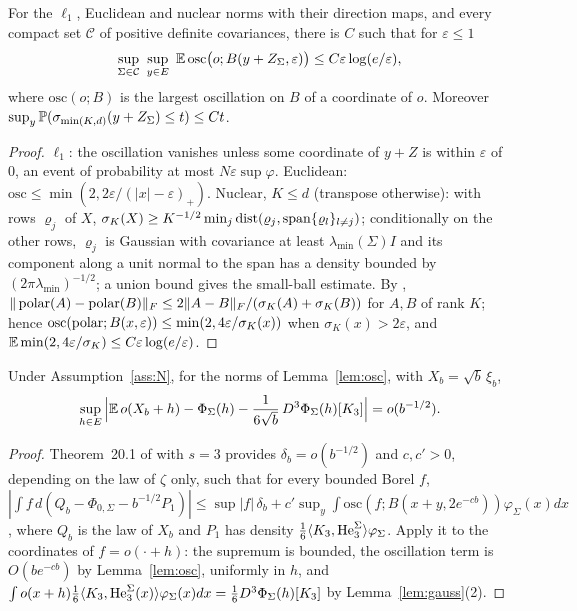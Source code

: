 \begin{lemma}[oscillation]\label{lem:osc}
For the $\ell_1$, Euclidean and nuclear norms with their direction maps, and every compact set $\mathcal C$ of positive
definite covariances, there is $C$ such that for $\varepsilon\le1$
\[
\sup_{\Sigma\in\mathcal C}\ \sup_{y\in E}\ \E\,\mathrm{osc}\big(o;B(y+Z_\Sigma,\varepsilon)\big)\le C\varepsilon\log(e/\varepsilon),
\]
where $\mathrm{osc}(o;B)$ is the largest oscillation on $B$ of a coordinate of $o$. Moreover
$\sup_y\mathbb{P}(\sigma_{\min(K,d)}(y+Z_\Sigma)\le t)\le Ct$.
\end{lemma}
\begin{proof}
$\ell_1$: the oscillation vanishes unless some coordinate of $y+Z$ is within $\varepsilon$ of $0$, an event of
probability at most $N\varepsilon\sup\varphi$. Euclidean: $\mathrm{osc}\le\min(2,2\varepsilon/(|x|-\varepsilon)_+)$.
Nuclear, $K\le d$ (transpose otherwise): with rows $\varrho_j$ of $X$,
$\sigma_K(X)\ge K^{-1/2}\min_j\operatorname{dist}(\varrho_j,\operatorname{span}\{\varrho_l\}_{l\ne j})$; conditionally on the other rows,
$\varrho_j$ is Gaussian with covariance at least $\lambda_{\min}(\Sigma)I$ and its component along a unit normal to the
span has a density bounded by $(2\pi\lambda_{\min})^{-1/2}$; a union bound gives the small-ball estimate. By
\citet{lisun}, $\|\operatorname{polar}(A)-\operatorname{polar}(B)\|_{F}\le2\|A-B\|_{F}/(\sigma_K(A)+\sigma_K(B))$ for $A,B$ of rank $K$; hence
$\mathrm{osc}(\operatorname{polar};B(x,\varepsilon))\le\min(2,4\varepsilon/\sigma_K(x))$ when $\sigma_K(x)>2\varepsilon$, and
$\mathbb{E}\min(2,4\varepsilon/\sigma_K)\le C\varepsilon\log(e/\varepsilon)$.
\end{proof}

\begin{lemma}\label{lem:edge}
Under Assumption~\ref{ass:N}, for the norms of Lemma~\ref{lem:osc}, with $X_b=\sqrt b\,\xi_b$,
\[
\sup_{h\in E}\Big|\mathbb{E}\,o(X_b+h)-\Phi_\Sigma(h)-\frac1{6\sqrt b}\,D^3\Phi_\Sigma(h)[K_3]\Big|=o(b^{-1/2}).
\]
\end{lemma}
\begin{proof}
Theorem~20.1 of \citet{br} with $s=3$ provides $\delta_b=o(b^{-1/2})$ and $c,c'>0$, depending on the law of $\zeta$ only,
such that for every bounded Borel $f$,
$|\int f\,d(Q_b-\Phi_{0,\Sigma}-b^{-1/2}P_1)|\le\sup|f|\,\delta_b+c'\sup_y\int\mathrm{osc}(f;B(x+y,2e^{-cb}))\varphi_\Sigma(x)dx$,
where $Q_b$ is the law of $X_b$ and $P_1$ has density $\frac16\langle K_3, \mathrm{He}_3^\Sigma\rangle\varphi_\Sigma$. Apply it to the
coordinates of $f=o(\cdot+h)$: the supremum is bounded, the oscillation term is $O(be^{-cb})$ by Lemma~\ref{lem:osc},
uniformly in $h$, and $\int o(x+h)\frac16\langle K_3, \mathrm{He}^\Sigma_3(x)\rangle\varphi_\Sigma(x)dx=\frac16D^3\Phi_\Sigma(h)[K_3]$ by
Lemma~\ref{lem:gauss}(2).
\end{proof}

